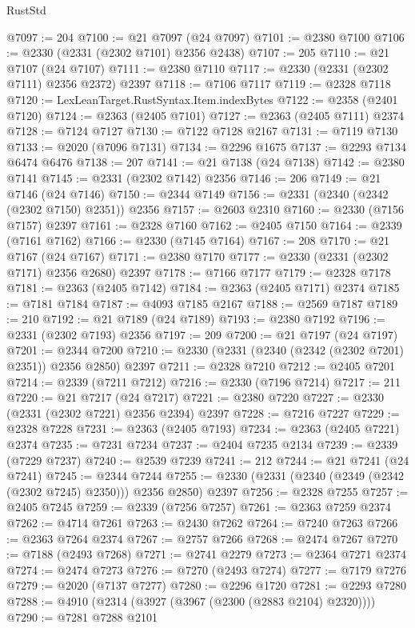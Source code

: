 \begin{lexlean}{RustStd}
\begin{coremodule}
@7097 := 204
@7100 := @21 @7097 (@24 @7097)
@7101 := @2380 @7100
@7106 := @2330 (@2331 (@2302 @7101) @2356 @2438)
@7107 := 205
@7110 := @21 @7107 (@24 @7107)
@7111 := @2380 @7110
@7117 := @2330 (@2331 (@2302 @7111) @2356 @2372) @2397
@7118 := @7106 @7117
@7119 := @2328 @7118
@7120 := LexLeanTarget.RustSyntax.Item.indexBytes
@7122 := @2358 (@2401 @7120)
@7124 := @2363 (@2405 @7101)
@7127 := @2363 (@2405 @7111) @2374
@7128 := @7124 @7127
@7130 := @7122 @7128 @2167
@7131 := @7119 @7130
@7133 := @2020 (@7096 @7131)
@7134 := @2296 @1675
@7137 := @2293 @7134 @6474 @6476
@7138 := 207
@7141 := @21 @7138 (@24 @7138)
@7142 := @2380 @7141
@7145 := @2331 (@2302 @7142) @2356
@7146 := 206
@7149 := @21 @7146 (@24 @7146)
@7150 := @2344 @7149
@7156 := @2331 (@2340 (@2342 (@2302 @7150) @2351)) @2356
@7157 := @2603 @2310
@7160 := @2330 (@7156 @7157) @2397
@7161 := @2328 @7160
@7162 := @2405 @7150
@7164 := @2339 (@7161 @7162)
@7166 := @2330 (@7145 @7164)
@7167 := 208
@7170 := @21 @7167 (@24 @7167)
@7171 := @2380 @7170
@7177 := @2330 (@2331 (@2302 @7171) @2356 @2680) @2397
@7178 := @7166 @7177
@7179 := @2328 @7178
@7181 := @2363 (@2405 @7142)
@7184 := @2363 (@2405 @7171) @2374
@7185 := @7181 @7184
@7187 := @4093 @7185 @2167
@7188 := @2569 @7187
@7189 := 210
@7192 := @21 @7189 (@24 @7189)
@7193 := @2380 @7192
@7196 := @2331 (@2302 @7193) @2356
@7197 := 209
@7200 := @21 @7197 (@24 @7197)
@7201 := @2344 @7200
@7210 := @2330 (@2331 (@2340 (@2342 (@2302 @7201) @2351)) @2356 @2850) @2397
@7211 := @2328 @7210
@7212 := @2405 @7201
@7214 := @2339 (@7211 @7212)
@7216 := @2330 (@7196 @7214)
@7217 := 211
@7220 := @21 @7217 (@24 @7217)
@7221 := @2380 @7220
@7227 := @2330 (@2331 (@2302 @7221) @2356 @2394) @2397
@7228 := @7216 @7227
@7229 := @2328 @7228
@7231 := @2363 (@2405 @7193)
@7234 := @2363 (@2405 @7221) @2374
@7235 := @7231 @7234
@7237 := @2404 @7235 @2134
@7239 := @2339 (@7229 @7237)
@7240 := @2539 @7239
@7241 := 212
@7244 := @21 @7241 (@24 @7241)
@7245 := @2344 @7244
@7255 := @2330 (@2331 (@2340 (@2349 (@2342 (@2302 @7245) @2350))) @2356 @2850) @2397
@7256 := @2328 @7255
@7257 := @2405 @7245
@7259 := @2339 (@7256 @7257)
@7261 := @2363 @7259 @2374
@7262 := @4714 @7261
@7263 := @2430 @7262
@7264 := @7240 @7263
@7266 := @2363 @7264 @2374
@7267 := @2757 @7266
@7268 := @2474 @7267
@7270 := @7188 (@2493 @7268)
@7271 := @2741 @2279
@7273 := @2364 @7271 @2374
@7274 := @2474 @7273
@7276 := @7270 (@2493 @7274)
@7277 := @7179 @7276
@7279 := @2020 (@7137 @7277)
@7280 := @2296 @1720
@7281 := @2293 @7280
@7288 := @4910 (@2314 (@3927 (@3967 (@2300 (@2883 @2104) @2320))))
@7290 := @7281 @7288 @2101

\end{coremodule}
\end{lexlean}
